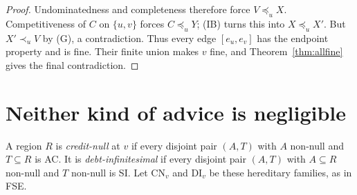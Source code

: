 \documentclass[11pt]{article}
\theoremstyle{remark}\newtheorem{remark}[theorem]{Remark}
\begin{document}
\begin{proof}
Undominatedness and completeness therefore force $V\preceq_uX$.
Competitiveness of $C$ on $\{u,v\}$ forces $C\preceq_uY$; (IB)
turns this into $X\preceq_uX'$. But $X'\prec_uV$ by (G), a
contradiction. Thus every edge $[e_u,e_v]$ has the endpoint property
and is fine. Their finite union makes $v$ fine, and
Theorem~\ref{thm:allfine} gives the final contradiction.
\end{proof}

\section{Neither kind of advice is negligible}

A region $R$ is \emph{credit-null} at $v$ if every disjoint pair $(A,T)$
with $A$ non-null and $T\subseteq R$ is AC. It is
\emph{debt-infinitesimal} if every disjoint pair $(A,T)$ with
$A\subseteq R$ non-null and $T$ non-null is SI. Let $\mathrm{CN}_v$
and $\mathrm{DI}_v$ be these hereditary families, as in FSE.
\end{document}

